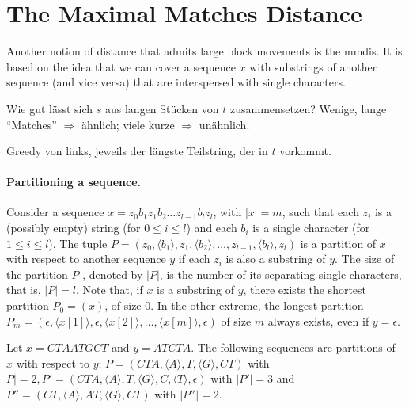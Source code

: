 

\section{The Maximal Matches Distance}\label{sec:the-maximal-matches-distance}
Another notion of distance that admits large block movements is the \gls{mmdis}.
It is based on the idea that we can cover a sequence $x$ with substrings of another
sequence (and vice versa) that are interspersed with single characters.
\begin{idee}
    Wie gut lässt sich $s$ aus langen Stücken von $t$ zusammensetzen?
    Wenige, lange
    ``Matches'' $\Rightarrow$ ähnlich; viele kurze $\Rightarrow$ unähnlich.

    Greedy von links, jeweils der
    längste Teilstring, der in $t$ vorkommt.
\end{idee}
\paragraph{Partitioning a sequence.} Consider a sequence $x = z_0 b_1 z_1 b_2 \dots z_{l-1} b_l z_l$, with $|x| = m$,
such that each $z_i$ is a (possibly empty) string (for $0 \leq i \leq l$) and each $b_i$ is a single
character (for $1 \leq i \leq l$). The tuple 
$P = (z_0 , \langle b_1 \rangle , z_1 , \langle b_2 \rangle , \dots, z_{l-1} , \langle b_l \rangle , z_l )$ is a partition
of $x$ with respect to another sequence $y$ if each $z_i$ is also a substring of $y$.
The size of
the partition $P$ , denoted by $|P|$, is the number of its separating single characters, that is, $|P| = l$.
Note that, if $x$ is a substring of $y$, there exists the shortest partition $P_0 = (x)$, of
size 0.
In the other extreme, the longest partition $P_m = (\epsilon, \langle x[1]\rangle , \epsilon, \langle x[2]\rangle , \dots , \langle x[m]\rangle , \epsilon)$
of size $m$ always exists, even if $y = \epsilon$.

\begin{bsp}
    Let $x = CTAATGCT$ and $y = ATCTA$.
    The following sequences are partitions of
    $x$ with respect to $y$: $P = (CTA, \langle A\rangle , T, \langle G\rangle , CT)$ with $P | = 2, P ' = (CTA, \langle A\rangle , T, \langle G\rangle , C, \langle T\rangle , \epsilon)$ with
    $|P ' | = 3$ and $P '' = (CT, \langle A\rangle , AT, \langle G\rangle , CT)$ with $|P '' | = 2$.
\end{bsp}

